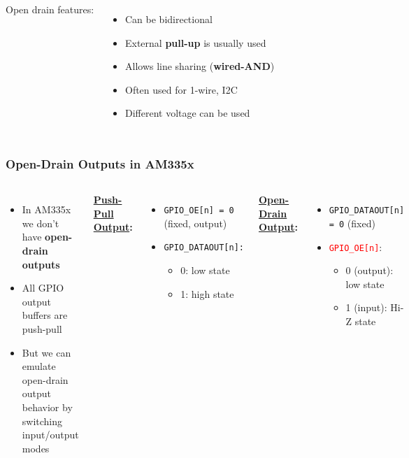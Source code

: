\begin{frame}
\begin{columns}
      \vspace{5mm}
      Open drain features:
      \begin{itemize}
        \item Can be bidirectional
        \item External \textbf{pull-up} is usually used
        \item Allows line sharing (\textbf{wired-AND})
        \item Often used for 1-wire, I2C
        \item Different voltage can be used
      \end{itemize}
  \end{columns}
\end{frame}

\begin{frame}
  \frametitle{Open-Drain Outputs in AM335x}
  \begin{columns}
      \begin{itemize}
        \item In AM335x we don't have \textbf{open-drain outputs}
        \item All GPIO output buffers are push-pull
        \item But we can emulate open-drain output behavior by
              \alert{switching input/output modes}
      \end{itemize}
      \textbf{\underline{Push-Pull Output}:}
      \begin{itemize}
        \item \texttt{GPIO\_OE[n] = 0} (fixed, output)
        \item \texttt{GPIO\_DATAOUT[n]:}
        \begin{itemize}
          \item 0: low state
          \item 1: high state
        \end{itemize}
      \end{itemize}
      \textbf{\underline{Open-Drain Output}:}
      \begin{itemize}
        \item \texttt{GPIO\_DATAOUT[n] = 0} (fixed)
        \item \texttt{\textcolor{red}{GPIO\_OE[n]}}:
        \begin{itemize}
          \item 0 (output): low state
          \item 1 (input): Hi-Z state
        \end{itemize}
      \end{itemize}
  \end{columns}
\end{frame}

